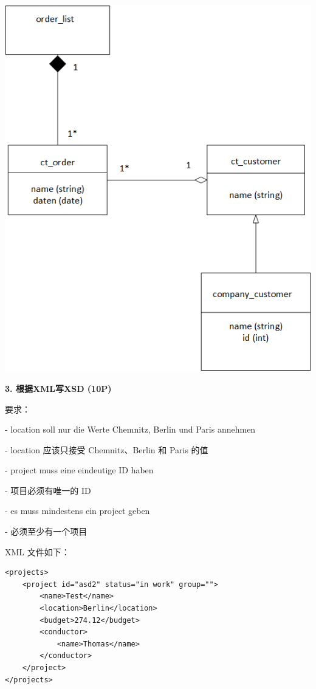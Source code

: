 \documentclass[fontset=windows]{article}
\begin{document}
\begin{center}

	\includegraphics[scale=0.6]{1.png}

\end{center}

\noindent\textbf{3. 根据XML写XSD (10P)}

要求：

- location soll nur die Werte Chemnitz, Berlin und Paris annehmen 

- location 应该只接受 Chemnitz、Berlin 和 Paris 的值

- project muss eine eindeutige ID haben

- 项目必须有唯一的 ID

- es muss mindestens ein project geben

- 必须至少有一个项目

XML 文件如下：

\begin{verbatim}
<projects>
	<project id="asd2" status="in work" group="">
		<name>Test</name>
		<location>Berlin</location>
		<budget>274.12</budget>
		<conductor>
			<name>Thomas</name>
		</conductor>
	</project>
</projects> 
\end{verbatim}
\end{document}
